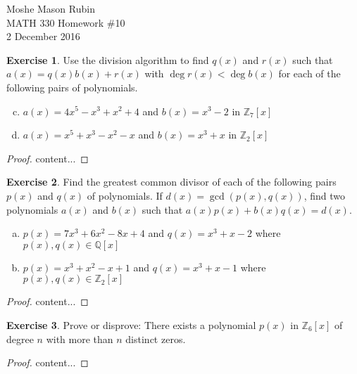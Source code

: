 \documentclass{article}
\theoremstyle{definition}
\newtheorem{theorem}{Exercise}[section]
\theoremstyle{plain}
\newcommand{\Z}{\mathbb{Z}}
\newcommand{\Q}{\mathbb{Q}}
\begin{document}
	\begin{flushright}
		Moshe Mason Rubin\\MATH 330 Homework \#10\\2 December 2016
	\end{flushright}
	
	
	\setcounter{theorem}{2}
	\begin{theorem}
		Use the division algorithm to find $q(x)$ and $r(x)$ such that $a(x) = q(x)b(x) + r(x)$ with $\deg r(x) < \deg b(x)$ for each of the following pairs of polynomials.
		\begin{multicols}{2}
		\begin{enumerate}[(a)]
			\setcounter{enumi}{2}
			\item $a(x) = 4x^5 - x^3 + x^2 + 4$ and $b(x) = x^3 - 2 $ in $\Z_7[x]$
			\item $a(x) = x^5 + x^3 - x^2 - x$ and $b(x) = x^3 + x$ in $\Z_2[x]$
		\end{enumerate}
		\end{multicols}
	\end{theorem}
	\begin{proof}
		content...
	\end{proof}
	
	\begin{theorem}
		Find the greatest common divisor of each of the following pairs $p(x)$ and $q(x)$ of polynomials. If $d(x) = \gcd\left( p(x), q(x) \right)$, find two polynomials $a(x)$ and $b(x)$ such that $a(x)p(x) + b(x)q(x) = d(x)$. 
		\begin{enumerate}[(a)]
			\item 	$p(x) = 7x^3 + 6x^2 - 8x + 4$ and $q(x) = x^3+x-2$ where $p(x), q(x) \in \Q[x]$
			\item 	$p(x) = x^3 + x^2 - x + 1$ and $q(x) = x^3+x-1$ where $p(x), q(x) \in \Z_2[x]$
		\end{enumerate}
	\end{theorem}
	\begin{proof}
		content...
	\end{proof}

	\setcounter{theorem}{10}
	\begin{theorem}
		Prove or disprove: There exists a polynomial $p(x)$ in $\Z_6[x]$ of degree $n$ with more than $n$ distinct zeros.
	\end{theorem}
	\begin{proof}
		content...
	\end{proof}
\end{document}
